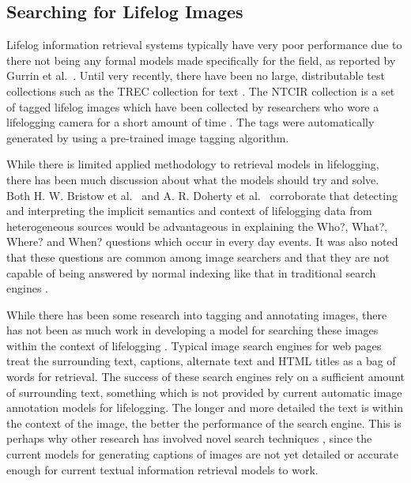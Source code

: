 \subsection{Searching for Lifelog Images}
Lifelog information retrieval systems typically have very poor performance due to there not being any formal models made specifically for the field, as reported by Gurrin et al.~\cite{gurrin2014lifelogging}. Until very recently, there have been no large, distributable test collections such as the TREC collection for text \cite{gurrin2014lifelogging}. The NTCIR collection is a set of tagged lifelog images which have been collected by researchers who wore a lifelogging camera for a short amount of time \cite{gurrin2016ntcir}. The tags were automatically generated by using a pre-trained image tagging algorithm.

While there is limited applied methodology to retrieval models in lifelogging, there has been much discussion about what the models should try and solve. Both H.  W.  Bristow et al.~\cite{bristow2004defining} and A. R. Doherty et al.~\cite{doherty2010automatically} corroborate that detecting and interpreting the implicit semantics and context of lifelogging data from heterogeneous sources would be advantageous in explaining the Who?, What?, Where? and When? questions which occur in every day events. It was also noted that these questions are common among image searchers and that they are not capable of being answered by normal indexing like that in traditional search engines \cite{ali2010semantically}.

While there has been some research into tagging and annotating images, there has not been as much work in developing a model for searching these images within the context of lifelogging \cite{gurrin2014lifelogging}. Typical image search engines for web pages treat the surrounding text, captions, alternate text and HTML titles \cite{frankel1996webseer} as a bag of words for retrieval. The success of these search engines rely on a sufficient amount of surrounding text, something which is not provided by current automatic image annotation models for lifelogging. The longer and more detailed the text is within the context of the image, the better the performance of the search engine. This is perhaps why other research has involved novel search techniques \cite{vuurpij2002vind}, since the current models for generating captions of images are not yet detailed or accurate enough for current textual information retrieval models to work.

